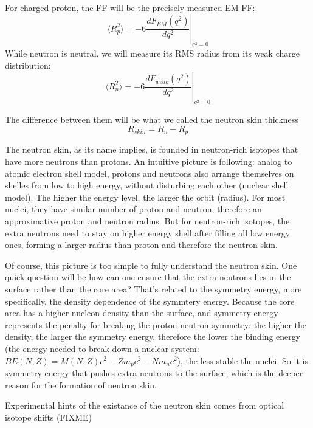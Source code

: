 For charged proton, the FF will be the precisely measured EM FF:
\begin{equation}
    \langle R_p^2 \rangle = -6 \left. \frac{dF_{EM}(q^2)}{dq^2} \right|_{q^2 = 0}
\end{equation}
While neutron is neutral, we will measure its RMS radius from its weak charge
distribution:
\begin{equation}
    \langle R_n^2 \rangle = -6 \left. \frac{dF_{weak}(q^2)}{dq^2} \right|_{q^2 = 0}
\end{equation}

The difference between them will be what we called the neutron skin thickness
\begin{equation}
    R_{skin} = R_n - R_p 
\end{equation}

The neutron skin, as its name implies, is founded in neutron-rich isotopes that
have more neutrons than protons. An intuitive picture is following: analog to
atomic electron shell model, protons and neutrons also arrange themselves on
shelles from low to high energy, without disturbing each other (nuclear shell model).
The higher the energy level, the larger the orbit (radius).
For most nuclei, they have similar number of proton and neutron, therefore an 
approximative proton and neutron radius. But for neutron-rich isotopes, the extra neutrons
need to stay on higher energy shell after filling all low energy ones, forming
a larger radius than proton and therefore the neutron skin.

Of course, this picture is too simple to fully understand the neutron skin.
One quick question will be how can one ensure that the extra neutrons lies 
in the surface rather than the core area? That's related to the symmetry energy, 
more specifically, the density dependence of the symmtery energy. 
Because the core area has a 
higher nucleon density than the surface, and symmetry energy represents the 
penalty for breaking the proton-neutron symmetry: the higher the density, the
larger the symmetry energy, therefore the lower the binding energy (the energy
needed to break down a nuclear system: $BE(N, Z) = M(N, Z)c^2 - Zm_p c^2 - Nm_n c^2$), the less
stable the nuclei. So it is symmetry energy that pushes extra neutrons to 
the surface, which is the deeper reason for the formation of neutron skin.

Experimental hints of the existance of the neutron skin comes from optical isotope
shifts (FIXME)
